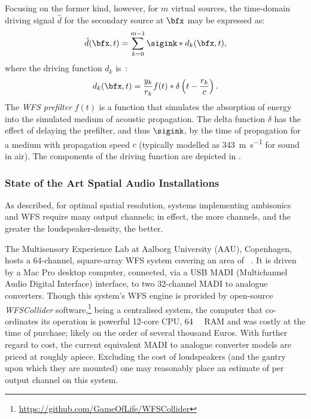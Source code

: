 Focusing on the former kind, however, for $m$ virtual sources, the time-domain
driving signal $\hat{d}$ for the secondary source at $\bfx$ may be expressed
as:
\begin{equation}
    \label{eq:driving-signal}
    \hat{d}(\bfx,t) = \sum_{k=0}^{m-1}\sigink \ast d_k(\bfx,t),
\end{equation}
where the driving function $d_k$ is~\citep{ahrens_analytic_2012}:
\begin{equation}
    \label{eq:driving-function}
    d_k(\bfx,t) = \frac{y_k}{r_k}f(t) \ast \delta\left(t - \frac{r_k}{c}\right).
\end{equation}
The \textit{WFS prefilter} $f(t)$ is a function that simulates the absorption of
energy into the simulated medium of acoustic propagation.
The delta function $\delta$ has the effect of delaying the prefilter, and thus
$\sigink$, by the time of propagation for a medium with propagation speed $c$
(typically modelled as \qty[per-mode=symbol]{343}{\m\per\s} for sound in air).
The components of the driving function are depicted in .

\subsubsection{State of the Art Spatial Audio Installations}
\label{subsubsec:spatial-sota}

As described, for optimal spatial resolution, systems implementing ambisonics
and WFS require many output channels; in effect, the more channels, and the
greater the loudspeaker-density, the better.

The Multisensory Experience Lab at Aalborg University (AAU), Copenhagen, hosts
a 64-channel, square-array WFS system covering an area of
~\citep{grani_gestural_2016}.
It is driven by a Mac Pro desktop computer, connected, via a USB MADI
(Multichannel Audio Digital Interface) interface, to two 32-channel MADI to
analogue converters.
Though this system's WFS engine is provided by open-source \textit{WFSCollider}
software,\footnote{\url{https://github.com/GameOfLife/WFSCollider}} being a
centralised system, the computer that co-ordinates its operation is powerful
\textemdash{} 12-core CPU, \qty{64}{\giga\byte} RAM \textemdash{} and was costly
at the time of purchase; likely on the order of several thousand Euros.
With further regard to cost, the current equivalent MADI to analogue converter
models are priced at roughly  apiece.
Excluding the cost of loudspeakers (and the gantry upon which they are mounted)
one may reasonably place an estimate of  per output channel on
this system.

